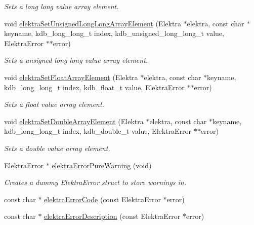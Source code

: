 \begin{DoxyCompactItemize}
\begin{DoxyCompactList}\small\item\em Sets a long long value array element. \end{DoxyCompactList}\item 
void \hyperlink{group__highlevel_gaf2096b0f3a20ca593daf5783a75e7327}{elektra\+Set\+Unsigned\+Long\+Long\+Array\+Element} (Elektra $\ast$elektra, const char $\ast$keyname, kdb\+\_\+long\+\_\+long\+\_\+t index, kdb\+\_\+unsigned\+\_\+long\+\_\+long\+\_\+t value, Elektra\+Error $\ast$$\ast$error)
\begin{DoxyCompactList}\small\item\em Sets a unsigned long long value array element. \end{DoxyCompactList}\item 
void \hyperlink{group__highlevel_ga64cdd0807210248d165e26f3a148e487}{elektra\+Set\+Float\+Array\+Element} (Elektra $\ast$elektra, const char $\ast$keyname, kdb\+\_\+long\+\_\+long\+\_\+t index, kdb\+\_\+float\+\_\+t value, Elektra\+Error $\ast$$\ast$error)
\begin{DoxyCompactList}\small\item\em Sets a float value array element. \end{DoxyCompactList}\item 
void \hyperlink{group__highlevel_gaeabf156194ace0dd75e95d2b23990fbb}{elektra\+Set\+Double\+Array\+Element} (Elektra $\ast$elektra, const char $\ast$keyname, kdb\+\_\+long\+\_\+long\+\_\+t index, kdb\+\_\+double\+\_\+t value, Elektra\+Error $\ast$$\ast$error)
\begin{DoxyCompactList}\small\item\em Sets a double value array element. \end{DoxyCompactList}\item 
Elektra\+Error $\ast$ \hyperlink{group__highlevel_ga4895fb4c40822a11219846b189395db0}{elektra\+Error\+Pure\+Warning} (void)
\begin{DoxyCompactList}\small\item\em Creates a dummy Elektra\+Error struct to store warnings in. \end{DoxyCompactList}\item 
const char $\ast$ \hyperlink{group__highlevel_ga22c0775760a9f42f29337c06bf8b2ab5}{elektra\+Error\+Code} (const Elektra\+Error $\ast$error)
\item 
const char $\ast$ \hyperlink{group__highlevel_ga781cda83af3981a55321e7c613afbef0}{elektra\+Error\+Description} (const Elektra\+Error $\ast$error)
$$
\end{DoxyCompactItemize}

